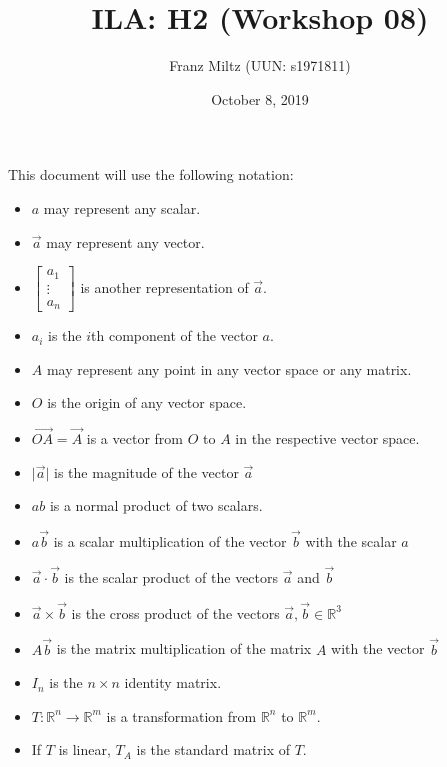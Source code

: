 \documentclass{article}
\title{ILA: H2 (Workshop 08)}
\author{Franz Miltz (UUN: s1971811)}
\date{October 8, 2019}
\begin{document}
\maketitle
This document will use the following notation:
\begin{itemize}
	\item $a$ may represent any scalar.
	\item $\vec{a}$ may represent any vector.
	\item $\begin{bmatrix}
			      a_1    \\
			      \vdots \\
			      a_n
		      \end{bmatrix}$ is another representation of $\vec a$.
	\item $a_i$ is the $i$th component of the vector $a$.
	\item $A$ may represent any point in any vector space or any matrix.
	\item $O$ is the origin of any vector space.
	\item $\vec{OA}=\vec{A}$ is a vector from $O$ to $A$ in the respective vector space.
	\item $\vert\vec{a}\vert$ is the magnitude of the vector $\vec{a}$
	\item $ab$ is a normal product of two scalars.
	\item $a\vec{b}$ is a scalar multiplication of the vector $\vec{b}$ with the scalar $a$
	\item $\vec{a}\cdot\vec{b}$ is the scalar product of the vectors $\vec{a}$ and $\vec{b}$
	\item $\vec a\times\vec b$ is the cross product of the vectors $\vec a, \vec b \in \mathbb{R}^3$
	\item $A\vec b$ is the matrix multiplication of the matrix $A$ with the vector $\vec b$
	\item $I_n$ is the $n\times n$ identity matrix.
	\item $T:\mathbb{R}^n\to\mathbb{R}^m$ is a transformation from $\mathbb{R}^n$ to $\mathbb{R}^m$.
	\item If $T$ is linear, $T_A$ is the standard matrix of $T$.
\end{itemize}
\end{document}
